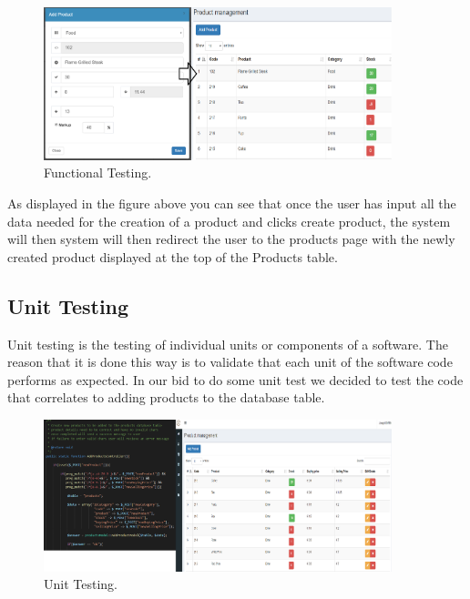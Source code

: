 \begin{figure}[h!]
	\caption{Functional Testing.}
	\label{image:myImageName}
	\centering
	\includegraphics[width=0.9\textwidth]{Fig images/Functionaltest1+2.png}
\end{figure}


As displayed in the figure above you can see that once the user has input all the data needed for the creation of a product and clicks create product, the system will then system will then redirect the user to the products page with the newly created product displayed at the top of the Products table.

\subsection{Unit Testing}
Unit testing is the testing of individual units or components of a software. The reason that it is done this way is to validate that each unit of the software code performs as expected.
\newline
\newline
In our bid to do some unit test we decided to test the code that correlates to adding products to the database table.
\newline
\newline


\begin{figure}[h!]
	\caption{Unit Testing.}
	\label{image:myImageName}
	\centering
	\includegraphics[width=0.9\textwidth]{Fig images/Unittest1+gui3.png}
\end{figure}


